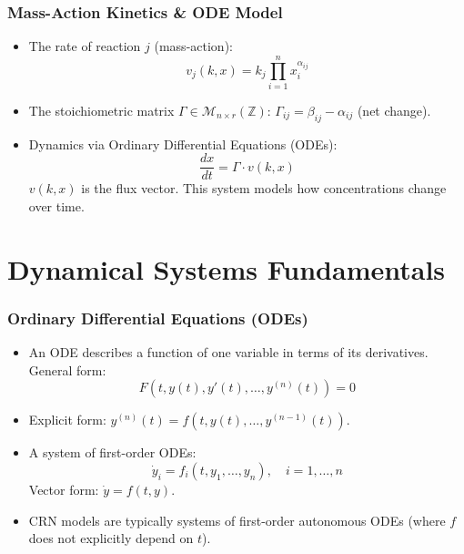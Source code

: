 \documentclass[aspectratio=169]{beamer}
\begin{document}
\begin{frame}{\insertsectionhead}
	\frametitle{Mass-Action Kinetics \& ODE Model}
	\begin{itemize}
		\item The \alert{rate} of reaction $j$ (mass-action):
			$$ v_j(k,x) = k_j \prod_{i=1}^{n} x_i^{\alpha_{ij}} $$
		\item The \alert{stoichiometric matrix} $\Gamma \in \mathcal{M}_{n \times r}(\mathbb{Z})$: $\Gamma_{ij} = \beta_{ij} - \alpha_{ij}$ (net change).
		\item Dynamics via Ordinary Differential Equations (ODEs):
			$$ \frac{dx}{dt} = \Gamma \cdot v(k,x) $$
			$v(k,x)$ is the flux vector. This system models how concentrations change over time.
	\end{itemize}
\end{frame}

\section{Dynamical Systems Fundamentals}

\begin{frame}{\insertsectionhead}
	\frametitle{Ordinary Differential Equations (ODEs)}
	\begin{itemize}
		\item An ODE describes a function of one variable in terms of its derivatives. General form:
			$$ F(t, y(t), y'(t), \dots, y^{(n)}(t)) = 0 $$
		\item \alert{Explicit form}: $y^{(n)}(t) = f(t, y(t), \dots, y^{(n-1)}(t))$.
		\item A \alert{system of first-order ODEs}:
			$$ \dot{y}_i = f_i(t, y_1, \dots, y_n), \quad i=1, \dots, n $$
			Vector form: $\dot{y} = f(t,y)$.
		\item CRN models are typically systems of first-order \alert{autonomous} ODEs (where $f$ does not explicitly depend on $t$).
	\end{itemize}
\end{frame}
\end{document}
